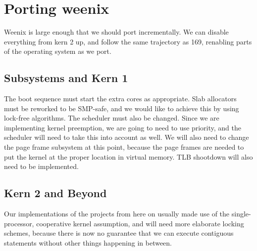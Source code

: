 \documentclass{article}
\begin{document}
\section{Porting weenix}

Weenix is large enough that we should port incrementally. We can disable everything from kern 2 up, and follow the same
trajectory as 169, renabling parts of the operating system as we port.

\subsection{Subsystems and Kern 1}

The boot sequence must start the extra cores as appropriate. Slab allocators must be reworked to be SMP-safe,
and we would like to achieve this by using lock-free algorithms. The scheduler must also be changed. Since we
are implementing kernel preemption, we are going to need to use priority, and the scheduler will need to take
this into account as well. We will also need to change the page frame subsystem at this point, because
the page frames are needed to put the kernel at the proper location in virtual memory. TLB shootdown will also
need to be implemented.

\subsection{Kern 2 and Beyond}

Our implementations of the projects from here on usually made use of the single-processor, cooperative kernel
assumption, and will need more elaborate locking schemes, because there is now no guarantee that we can
execute contiguous statements without other things happening in between.
\end{document}
